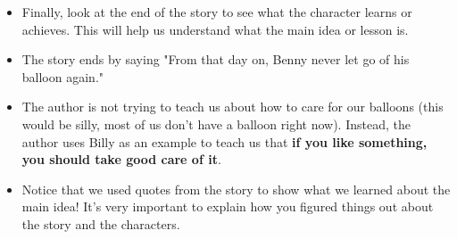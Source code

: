 \documentclass[12pt]{article}
\begin{document}
\begin{tcolorbox}[colframe=black!60, colback=white, 
coltitle=black, colbacktitle=black!15, fonttitle=\bfseries\Large, 
title=Examples, halign title=center, left=10pt, right=10pt, top=10pt, bottom=15pt]
\begin{itemize}
                
        \end{itemize}

\begin{itemize}
    \item Finally, look at the end of the story to see what the character learns or achieves. This will help us understand what the main idea or lesson is.
\end{itemize}
            \begin{itemize}
             
                    \item The story ends by saying "From that day on, Benny never let go of his balloon again."
                
            \end{itemize}
            \begin{itemize}


                    \item The author is not trying to teach us about how to care for our balloons (this would be silly, most of us don't have a balloon right now). Instead, the author uses Billy as an example to teach us that \textbf{if you like something, you should take good care of it}.
            
            \end{itemize}
\begin{itemize}
  
        \item Notice that we used quotes from the story to show what we learned about the main idea! It's very important to explain how you figured things out about the story and the characters.

\end{itemize}


 





     \end{tcolorbox}

\vspace{1em}
\end{document}
